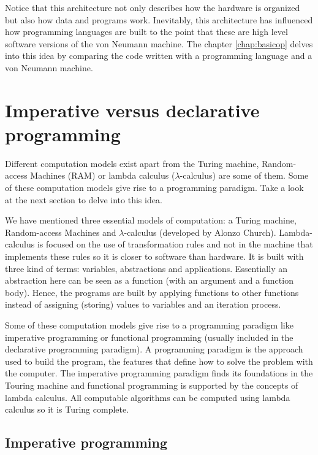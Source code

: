 Notice that this architecture not only describes how the hardware is organized but also how data and programs work.
Inevitably, this architecture has influenced how programming languages are built to the point that 
these are high level software versions of the von Neumann machine. 
The chapter \ref{chap:basicop} delves into this idea by comparing the code written with a programming language and a von Neumann machine.



 
 
    \section{Imperative versus declarative programming} 

Different computation models exist apart from the Turing machine, 
Random-access Machines (RAM) or lambda calculus ($\lambda$-calculus) are some of them. 
Some of these computation models give rise to a programming paradigm. 
Take a look at the next section to delve into this idea.  

We have mentioned three essential models of computation: a Turing machine, Random-access Machines and $\lambda$-calculus (developed by Alonzo Church).
Lambda-calculus is focused on the use of transformation rules and not in the machine that implements these rules so it is closer to software than hardware.
It is built with three kind of terms: variables, abstractions and applications. 
Essentially an abstraction here can be seen as a function (with an argument and a function body). 
Hence, the programs are built by applying functions to other functions instead of assigning (storing) values to variables and an iteration process. 

Some of these computation models give rise to a programming paradigm like imperative programming or functional programming (usually included in the declarative programming paradigm).
A programming paradigm is the approach used to build the program, the features that define how to solve the problem with the computer. 
The imperative programming paradigm finds its foundations in the Touring machine and functional programming is supported by the concepts of lambda calculus. 
All computable algorithms can be computed using lambda calculus so it is Turing complete.



        \subsection*{Imperative programming}
    
